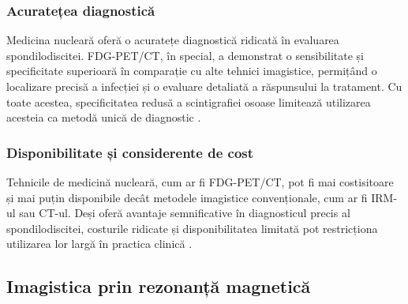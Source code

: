 \documentclass[romanian,12pt,a4paper]{article}
\begin{document}
\subsubsection{Acuratețea diagnostică}

Medicina nucleară oferă o acuratețe diagnostică ridicată în evaluarea
spondilodiscitei. FDG-PET/CT, în special, a demonstrat o sensibilitate
și specificitate superioară în comparație cu alte tehnici imagistice,
permițând o localizare precisă a infecției și o evaluare detaliată a
răspunsului la tratament. Cu toate acestea, specificitatea redusă a
scintigrafiei osoase limitează utilizarea acesteia ca metodă unică de
diagnostic
\cite{RadionuclideImagingMusculoskeletal2016}\cite{RoleNuclearMedicine2012}
.

\subsubsection{Disponibilitate și considerente de cost}

Tehnicile de medicină nucleară, cum ar fi FDG-PET/CT, pot fi mai
costisitoare și mai puțin disponibile decât metodele imagistice
convenționale, cum ar fi IRM-ul sau CT-ul. Deși oferă avantaje
semnificative în diagnosticul precis al spondilodiscitei, costurile
ridicate și disponibilitatea limitată pot restricționa utilizarea lor
largă în practica clinică \cite{ImagingAssessmentSpine2024}.

\subsection{Imagistica prin rezonanță magnetică}
\end{document}
